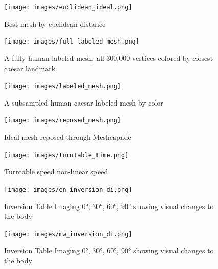 \begin{figure}[!htb]
        \caption{Best mesh by euclidean distance}
        \centering
        \texttt{[image: images/euclidean\_ideal.png]}
\end{figure}

\begin{figure}[!htb]
        \caption{A fully human labeled mesh, all 300,000 vertices colored by closest caesar landmark}
        \centering
        \texttt{[image: images/full\_labeled\_mesh.png]}
\end{figure}

\begin{figure}[!htb]
        \caption{A subsampled human caesar labeled mesh by color}
        \centering
        \texttt{[image: images/labeled\_mesh.png]}
\end{figure}

\begin{figure}[!htb]
        \caption{Ideal mesh reposed through Meshcapade}
        \centering
        \texttt{[image: images/reposed\_mesh.png]}
\end{figure}

\begin{figure}[!htb]
        \caption{Turntable speed non-linear speed}
        \centering
        \texttt{[image: images/turntable\_time.png]}
\end{figure}

\begin{figure}[!htb]
        \caption{Inversion Table Imaging \ang{0}, \ang{30}, \ang{60}, \ang{90} showing visual changes to the body}
        \centering
        \texttt{[image: images/en\_inversion\_di.png]}
\end{figure}
\begin{figure}[!htb]
        \caption{Inversion Table Imaging \ang{0}, \ang{30}, \ang{60}, \ang{90} showing visual changes to the body}
        \centering
        \texttt{[image: images/mw\_inversion\_di.png]}
\end{figure}
